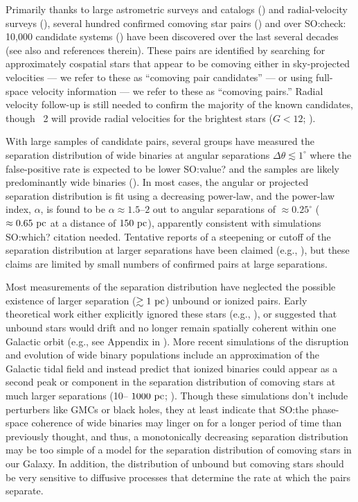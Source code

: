 \documentclass[modern, letterpaper]{aastex61}
\newcommand{\gaia}{\project{Gaia}}
\newcommand{\DR}[1]{\acronym{DR}#1}
\newcommand{\smoh}[1]{\textcolor{mediumpersianblue}{SO:#1}}
\begin{document}
Primarily thanks to large astrometric surveys and catalogs
(\citealt{ESA:1997,Lepine:2005,Gaia-Collaboration:2016}) and radial-velocity
surveys (\citealt{Steinmetz:2006}), several hundred confirmed comoving star
pairs (\citealt{Shaya:2011}) and over \smoh{check: 10,000} candidate systems
(\citealt{Gould:2004,Lepine:2007,Tokovinin:2012,Allen:2014,Oh:2017,
Oelkers:2017, Andrews:2017}) have been discovered over the last several decades
(see also \citealt{Chaname:2007} and references therein).
These pairs are identified by searching for approximately cospatial stars that
appear to be comoving either in sky-projected velocities --- we refer to these
as ``comoving pair candidates'' --- or using full-space velocity information ---
we refer to these as ``comoving pairs.''
Radial velocity follow-up is still needed to confirm the majority of the known
candidates, though \gaia\ \DR{2} will provide radial velocities for the
brightest stars ($G < 12$; \citealt{Gaia-Collaboration:2016}).

With large samples of candidate pairs, several groups have measured the
separation distribution of wide binaries at angular separations $\Delta \theta
\lesssim 1^\circ$ where the false-positive rate is expected to be lower \smoh{value?}
and the samples are likely predominantly wide binaries
(\citealt{Chaname:2004,Lepine:2007,Sesar:2008}).
In most cases, the angular or projected separation distribution is fit using a
decreasing power-law, and the power-law index, $\alpha$, is found to be $\alpha
\approx 1.5$--$2$ out to angular separations of $\approx 0.25^\circ$ ($\approx
0.65~\mathrm{pc}$ at a distance of $150~\mathrm{pc}$), apparently consistent with simulations \smoh{which? citation needed}.
Tentative reports of a steepening or cutoff of the separation distribution at
larger separations have been claimed (e.g., \citealt{Yoo:2004,Quinn:2009}), but
these claims are limited by small numbers of confirmed pairs at large
separations.

Most measurements of the separation distribution have neglected the possible
existence of larger separation ($\gtrsim 1~\mathrm{pc}$) unbound or ionized pairs.
Early theoretical work either explicitly ignored these stars (e.g.,
\citealt{Weinberg:1987}), or suggested that unbound stars would drift and no
longer remain spatially coherent within one Galactic orbit (e.g., see Appendix
in \citealt{Yoo:2004}).
More recent simulations of the disruption and evolution of wide binary
populations include an approximation of the Galactic tidal field and instead
predict that ionized binaries could appear as a second peak or component in the
separation distribution of comoving stars at much larger separations (10--
$1000~\mathrm{pc}$; \citealt{Jiang:2010}).
Though these simulations don't include perturbers like GMCs or black holes,
they at least indicate that \smoh{the phase-space coherence of wide binaries
  may linger on for a longer period of time than previously thought, and thus,
  a monotonically decreasing separation distribution may
be too simple of a model for the separation distribution of comoving stars in
our Galaxy.}
In addition, the distribution of unbound but comoving stars should be very
sensitive to diffusive processes that determine the rate at which the pairs
separate.
\end{document}
